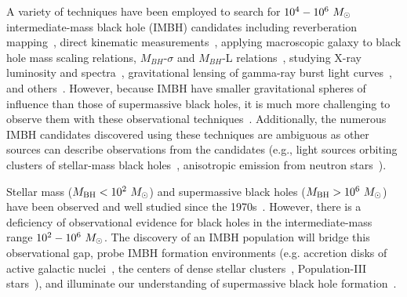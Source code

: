 \documentclass[useAMS,fleqn, usenatbib, final]{mnras}
\newcommand{\mathcmd}[1]{{\sc \relax\ifmmode#1\else $#1$\fi}\xspace}
\newcommand{\msun}{\mathcmd{M_\odot}}
\begin{document}
A variety of techniques have been employed to search for ${10^{4} - 10^{6}~\msun}$ intermediate-mass black hole (IMBH) candidates including reverberation mapping~\citep{Peterson:2014:SSRv}, direct kinematic measurements~\citep{Schodel:2002:Natur, Kiziltan:2017:Natur}, applying macroscopic galaxy to black hole mass scaling relations, $M_{BH}$-$\sigma$ and $M_{BH}$-L relations~\citep{Graham:2013:ApJ, Wevers:2017:MNRAS}, studying  X-ray luminosity and spectra~\citep{Greene:2004:ApJ, Lin:2020:ApJL}, gravitational lensing of gamma-ray burst light curves~\citep{paynter_evidence_2021}, and others~\citep[see][]{Greene:2020:ARA&A, Koliopanos:2017:mbhe, Mezcua:2017:IJMPD}. However, because IMBH have smaller gravitational spheres of influence than those of supermassive black holes, it is much more challenging to observe them with these observational techniques~\citep{Mezcua:2017:IJMPD}. Additionally, the numerous IMBH candidates discovered using these techniques are ambiguous as other sources can describe observations from the candidates (e.g., light sources orbiting clusters of stellar-mass black holes~\citealt{Ridolfi:2016:MNRAS, Freire:2017:MNRAS},  anisotropic emission from neutron stars~\citealt{Israel:2017:MNRAS, RodriguezCastillo:2020:ApJ}).

Stellar mass (${M_\text{BH} < 10^{2}~\msun}$) and supermassive black holes (${M_\text{BH} > 10^{6}~\msun}$) have been observed and well studied since the 1970s~\citep{Webster:1972:Natur, Balick:1974:ApJ, Ghez:1998:ApJ, Genzel:2010:RvMP, Abbott:2019:PhRvX, EventHorizonTelescopeCollaboration:2019:ApJL, Abbott:2020:arXiv}. However, there is a deficiency of observational evidence for black holes in the intermediate-mass range ${10^{2} - 10^{6}~\msun}$. The discovery of an IMBH population will bridge this observational gap, probe IMBH formation environments (e.g. accretion disks of active galactic nuclei~\citealt{Tagawa:2021:ApJ, Li:2021:arXiv, Samsing:2020:arXiv, Tagawa:2020:ApJ, Ishibashi:2020:A&A, Grobner:2020:A&A, Yang:2019:PhRvL, McKernan:2019:ApJL, Yang:2019:ApJ, McKernan:2018:ApJ, Bellovary:2016:ApJL, McKernan:2014:MNRAS, McKernan:2012:MNRAS}, the centers of dense stellar clusters~\citealt{Banerjee:2021:MNRASa, Zevin:2021:ApJ,Mapelli:2021:arXiv,Weatherford:2021:ApJL, Bouffanais:2021:arXiv, Ballone:2021:MNRAS, Kumamoto:2021:arXiv, Banerjee:2021:MNRASb, Martinez:2020:ApJ, Romero-Shaw:2020:ApJL, Anagnostou:2020:PASA}, Population-III stars~\citealt{Toubiana:2021:PhRvL, Farrell:2021:MNRAS, Safarzadeh:2020:ApJL, Liu:2020:MNRAS, Inayoshi:2017:MNRAS}), and illuminate our understanding of supermassive black hole formation~\citep{Askar:2021:MNRAS, ArcaSedda:2019:arXiv, Amaro-Seoane:2007:CQGra, Gurkan:2006:ApJL}. 
\end{document}

